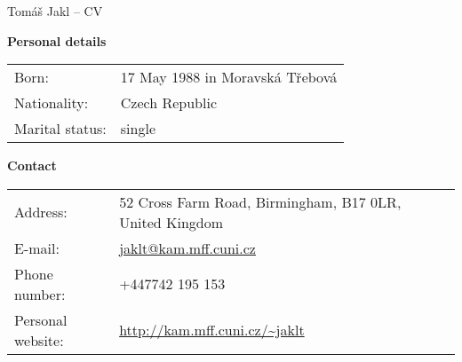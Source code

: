 \documentclass[a4paper, 11pt]{article}
\begin{document}
\setlength{\parindent}{0pt}
\setlength{\parskip}{0.5 em}
\def\section#1{\par\medskip\centerline{\bf #1}\smallskip}

\begin{center}
{\LARGE Tomáš Jakl -- CV}
\end{center}

\textbf{Personal details}

\begin{tabular}{l l}
    Born: & 17 May 1988 in Moravská Třebová\\
    Nationality: & Czech Republic\\
    Marital status:  & single \\
\end{tabular}

\textbf{Contact}

\begin{tabular}{l l}
    Address: & 52 Cross Farm Road, Birmingham, B17 0LR, United Kingdom \\
    E-mail: & \url{jaklt@kam.mff.cuni.cz} \\
    Phone number: & +447742 195 153 \\
    Personal website: & \url{http://kam.mff.cuni.cz/~jaklt}
\end{tabular}

\vspace{0.5em}
\end{document}
